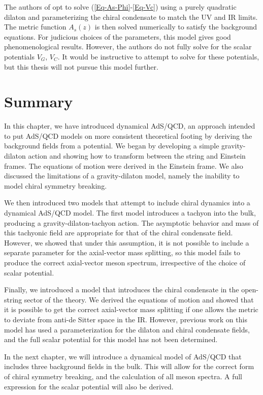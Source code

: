 The authors of \cite{Li2013,Li2013a} opt to solve (\ref{Eq-As-Phi}-\ref{Eq-Vc}) using a purely quadratic dilaton and parameterizing the chiral condensate to match the UV and IR limits. 
The metric function $A_s(z)$ is then solved numerically to satisfy the background equations.
For judicious choices of the parameters, this model gives good phenomenological results.
However, the authors do not fully solve for the scalar potentials $V_G$, $V_C$.
It would be instructive to attempt to solve for these potentials, but this thesis will not pursue this model further.

\section{Summary}
In this chapter, we have introduced dynamical AdS/QCD, an approach intended to put AdS/QCD models on more consistent theoretical footing by deriving the background fields from a potential.
We began by developing a simple gravity-dilaton action and showing how to transform between the string and Einstein frames.
The equations of motion were derived in the Einstein frame.
We also discussed the limitations of a gravity-dilaton model, namely the inability to model chiral symmetry breaking.

We then introduced two models that attempt to include chiral dynamics into a dynamical AdS/QCD model. 
The first model introduces a tachyon into the bulk, producing a gravity-dilaton-tachyon action. 
The asymptotic behavior and mass of this tachyonic field are appropriate for that of the chiral condensate field.
However, we showed that under this assumption, it is not possible to include a separate parameter for the axial-vector mass splitting, so this model fails to produce the correct axial-vector meson spectrum, irrespective of the choice of scalar potential.

Finally, we introduced a model that introduces the chiral condensate in the open-string sector of the theory. 
We derived the equations of motion and showed that it is possible to get the correct axial-vector mass splitting if one allows the metric to deviate from anti-de Sitter space in the IR.
However, previous work on this model has used a parameterization for the dilaton and chiral condensate fields, and the full scalar potential for this model has not been determined.

In the next chapter, we will introduce a dynamical model of AdS/QCD that includes three background fields in the bulk.
This will allow for the correct form of chiral symmetry breaking, and the calculation of all meson spectra. 
A full expression for the scalar potential will also be derived.






